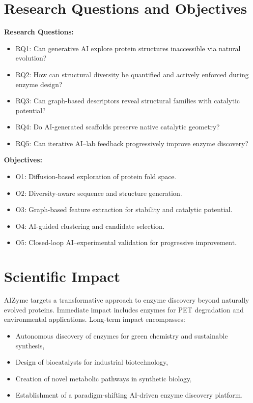 \documentclass[runningheads]{llncs}
\begin{document}
	\section{Research Questions and Objectives}
	
	\textbf{Research Questions:}
	
	\begin{itemize}
		\item RQ1: Can generative AI explore protein structures inaccessible via natural evolution?
		\item RQ2: How can structural diversity be quantified and actively enforced during enzyme design?
		\item RQ3: Can graph-based descriptors reveal structural families with catalytic potential?
		\item RQ4: Do AI-generated scaffolds preserve native catalytic geometry?
		\item RQ5: Can iterative AI–lab feedback progressively improve enzyme discovery?
	\end{itemize}
	
	\textbf{Objectives:}
	
	\begin{itemize}
		\item O1: Diffusion-based exploration of protein fold space.
		\item O2: Diversity-aware sequence and structure generation.
		\item O3: Graph-based feature extraction for stability and catalytic potential.
		\item O4: AI-guided clustering and candidate selection.
		\item O5: Closed-loop AI–experimental validation for progressive improvement.
	\end{itemize}
	
	\section{Scientific Impact}
	
	AIZyme targets a transformative approach to enzyme discovery beyond naturally evolved proteins. Immediate impact includes enzymes for PET degradation and environmental applications. Long-term impact encompasses:
	
	\begin{itemize}
		\item Autonomous discovery of enzymes for green chemistry and sustainable synthesis,
		\item Design of biocatalysts for industrial biotechnology,
		\item Creation of novel metabolic pathways in synthetic biology,
		\item Establishment of a paradigm-shifting AI-driven enzyme discovery platform.
	\end{itemize}
	
\end{document}

